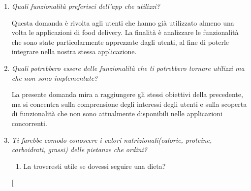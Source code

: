 \documentclass{article}
\begin{document}
\begin{enumerate}
\begin{tcolorbox}
        \end{tcolorbox}
    \item \textit{Quali funzionalità preferisci dell'app che utilizzi?}
        \begin{tcolorbox}[
            colframe=green,  %
            colback=white,  %
            sharp corners,  %
            boxrule=0.5pt,  %
            left=5pt,  %
            right=5pt,  %
            top=5pt,  %
            bottom=5pt  %
        ]
        Questa domanda è rivolta agli utenti che hanno già utilizzato almeno una volta le applicazioni di food delivery. La finalità è analizzare le funzionalità che sono state particolarmente apprezzate dagli utenti, al fine di poterle integrare nella nostra stessa applicazione.
        \end{tcolorbox}
    \item \textit{Quali potrebbero essere delle funzionalità che ti potrebbero tornare utilizzi ma che non sono implementate?}
        \begin{tcolorbox}[
            colframe=green,  %
            colback=white,  %
            sharp corners,  %
            boxrule=0.5pt,  %
            left=5pt,  %
            right=5pt,  %
            top=5pt,  %
            bottom=5pt  %
        ]
        La presente domanda mira a raggiungere gli stessi obiettivi della precedente, ma si concentra sulla comprensione degli interessi degli utenti e sulla scoperta di funzionalità che non sono attualmente disponibili nelle applicazioni concorrenti.
        \end{tcolorbox}
    \item \textit{Ti farebbe comodo conoscere i valori nutrizionali(calorie, proteine, carboidrati, grassi) delle pietanze che ordini?}
        \begin{enumerate}
            \item La troveresti utile se dovessi seguire una dieta?
        \end{enumerate}
        \begin{tcolorbox}[

\end{tcolorbox}
\end{enumerate}
\end{document}

